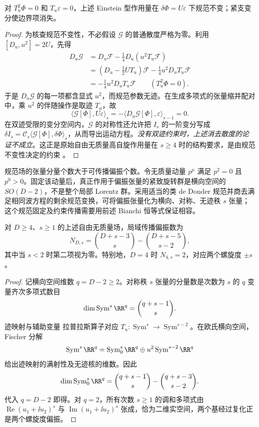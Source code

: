 \begin{proposition}[双迹受限的自由作用量]
对 $T_u^2\Phi=0$ 和 $T_u\varepsilon=0$，上述 Einstein 型作用量在 $\delta\Phi=U\varepsilon$ 下规范不变；紧支变分使边界项消失。
\end{proposition}
\begin{proof}
为核查规范不变性，不必假设 $\mathcal G$ 的普通散度严格为零。利用 $[D_u,u^2]=2U$，先得
\begin{align*}
 D_u\mathcal G
 &=D_u\mathcal F-\frac14D_u(u^2T_u\mathcal F)\\
 &=\left(D_u-\frac12UT_u\right)\mathcal F
   -\frac14u^2D_uT_u\mathcal F\\
 &=-\frac14u^2D_uT_u\mathcal F
 \qquad(T_u^2\Phi=0).
\end{align*}
于是 $D_u\mathcal G$ 的每一项都含显式 $u^2$，而规范参数无迹。在生成多项式的张量缩并配对中，乘 $u^2$ 的伴随操作是取迹 $T_u$，故
\[
 \langle\mathcal G[\Phi], U\varepsilon\rangle_s
 =-\langle D_u\mathcal G[\Phi],\varepsilon\rangle_{s-1}=0.
\]
在双迹受限的变分空间内，$\mathcal G$ 的对称性还允许把 $I_s$ 的一阶变分写成 $\delta I_s=\mathcal C_s\langle\mathcal G[\Phi],\delta\Phi\rangle_s$，从而导出运动方程。\emph{没有双迹约束时，上述消去散度的论证不成立}。这正是原始自由无质量高自旋作用量在 $s\ge4$ 时的结构要求，是由规范不变性决定的约束 \cite{r7-fronsdal-original,r7-covariant-spins}。

\end{proof}

规范场的张量分量个数大于可传播偏振个数。令无质量动量 $p^\mu$ 满足 $p^2=0$ 且 $p^0>0$。固定该动量后，真正作用于偏振张量的紧致旋转群是横向空间的 $SO(D-2)$，不是整个局部 Lorentz 群。采用适当的类 de Donder 规范并商去满足相同波方程的剩余规范变换，可将偏振张量化为横向、对称、无迹秩 $s$ 张量；这个规范固定及约束传播需要用前述 Bianchi 恒等式保证相容。

\begin{proposition}[无质量整数自旋的横向偏振数]\label{prop:ghs-r7-fronsdal-polarizations}
对 $D\ge4$、$s\ge1$ 的上述自由无质量场，局域传播偏振数为
\begin{equation}\label{eq:ghs-r7-fronsdal-physical-count}
 N_{D,s}=\binom{D+s-3}{s}-\binom{D+s-5}{s-2},
\end{equation}
其中当 $s<2$ 时第二项视为零。特别地，$D=4$ 时 $N_{4,s}=2$，对应两个螺旋度 $\pm s$。
\end{proposition}
\begin{proof}
记横向空间维数 $q=D-2\ge2$。对称秩 $s$ 张量的分量数是次数为 $s$ 的 $q$ 变量齐次多项式数目
\[
 \dim\operatorname{Sym}^s\RR^q=\binom{q+s-1}{s}.
\]
迹映射与辅助变量 拉普拉斯算子对应 $T_u: \operatorname{Sym}^s\to\operatorname{Sym}^{s-2}$。在欧氏横向空间，Fischer 分解
\[
 \operatorname{Sym}^s\RR^q
 =\operatorname{Sym}^s_0\RR^q\oplus
 u^2\operatorname{Sym}^{s-2}\RR^q
\]
给出迹映射的满射性及无迹核的维数。因此
\[
 \dim\operatorname{Sym}^s_0\RR^q
 =\binom{q+s-1}{s}-\binom{q+s-3}{s-2}.
\]
代入 $q=D-2$ 即得。对 $q=2$，所有次数 $s\ge1$ 的调和多项式由 $\operatorname{Re}(u_1+\ii u_2)^s$ 与 $\operatorname{Im}(u_1+\ii u_2)^s$ 张成，恰为二维实空间，两个基经过复化正是两个螺旋度偏振。
\end{proof}

